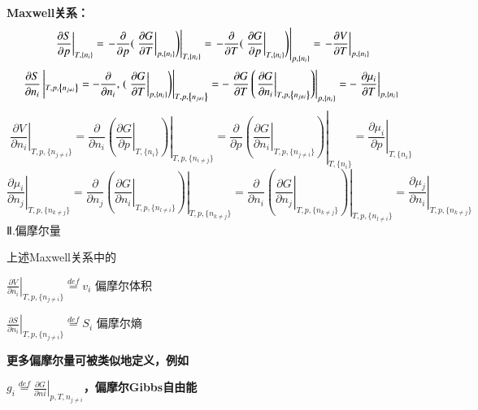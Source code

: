 \documentclass{article} %
\begin{document}
{\bf Maxwell关系：
\[\left. \left. \left. \frac{\partial S}{\partial p} \right|_{T,\{ n_{i} \} } =\left. -\frac{\partial }{\partial p} {\rm (}\left. \frac{\partial G}{\partial T} \right|_{p,\{ n_{i} \} } \right)\right|_{T,\{ n_{i} \} } =\left. -\frac{\partial }{\partial T} {\rm (}\left. \frac{\partial G}{\partial p} \right|_{T,\{ n_{i} \} } \right)\right|_{p,\{ n_{i} \} } =\left. -\frac{\partial V}{\partial T} \right|_{p,\{ n_{i} \} } \] 
\[\frac{\partial S}{\partial n_{i} } \left|{}_{T,p,\left\{n_{j\ne i} \right\}} =-\frac{\partial }{\partial n_{i} } ,\left. {\rm (}\left. \frac{\partial G}{\partial T} \right|_{p,\left\{n_{i} \right\}} \right)\right|_{T,p,\left\{n_{j\ne i} \right\}} =-\left. \frac{\partial G}{\partial T} \left(\left. \frac{\partial G}{\partial n_{i} } \right|_{T,p,\left\{n_{j\ne i} \right\}} \right)\right|_{p,\left\{n_{i} \right\}} =-\left. \frac{\partial \mu _{i} }{\partial T} \right|_{p,\left\{n_{i} \right\}} \] 
\[\left. \left. \left. \frac{\partial V}{\partial n_{i} } \right|_{T,p,\{ n_{j\ne i} \} } =\frac{\partial }{\partial n_{i} } \left(\left. \frac{\partial G}{\partial p} \right|_{T,\{ n_{i} \} } \right)\right|_{T,p,\{ n_{i\ne j} \} } =\frac{\partial }{\partial p} \left(\left. \frac{\partial G}{\partial n_{i} } \right|_{T,p,\{ n_{j\ne i} \} } \right)\right|_{T,\{ n_{i} \} } =\left. \frac{\partial \mu _{i} }{\partial p} \right|_{T,\{ n_{i} \} } \] 
\[\left. \frac{\partial \mu _{i} }{\partial n_{j} } \right|_{T,p,\{ n_{k\ne j} \} } =\frac{\partial }{\partial n_{j} } \left. \left(\left. \frac{\partial G}{\partial n_{i} } \right|_{T,p,\{ n_{l\ne i} \} } \right)\right|_{T,p,\{ n_{k\ne j} \} } =\frac{\partial }{\partial n_{i} } \left. \left(\left. \frac{\partial G}{\partial n_{j} } \right|_{T,p,\{ n_{k\ne j} \} } \right)\right|_{T,p,\{ n_{l\ne i} \} } =\left. \frac{\partial \mu _{j} }{\partial n_{i} } \right|_{T,p,\{ n_{k\ne j} \} } \] }
Ⅱ.偏摩尔量

\noindent 上述Maxwell关系中的

\noindent $\left. \frac{\partial V}{\partial n_{i} } \right|_{T,p,\{ n_{j\ne i} \} } {\mathop{=}\limits^{def}} v_{i} $  偏摩尔体积

\noindent $\left. \frac{\partial S}{\partial n_{i} } \right|_{T,p,\{ n_{j\ne i} \} } {\mathop{=}\limits^{def}} S_{i} $  偏摩尔熵


{\bf  更多偏摩尔量可被类似地定义，例如}

\noindent 
{\bf $g_{i} {\mathop{=}\limits^{def}} \left. \frac{\partial G}{\partial ni} \right|_{p,T,n_{j\ne i} } $，偏摩尔Gibbs自由能}
\end{document}
